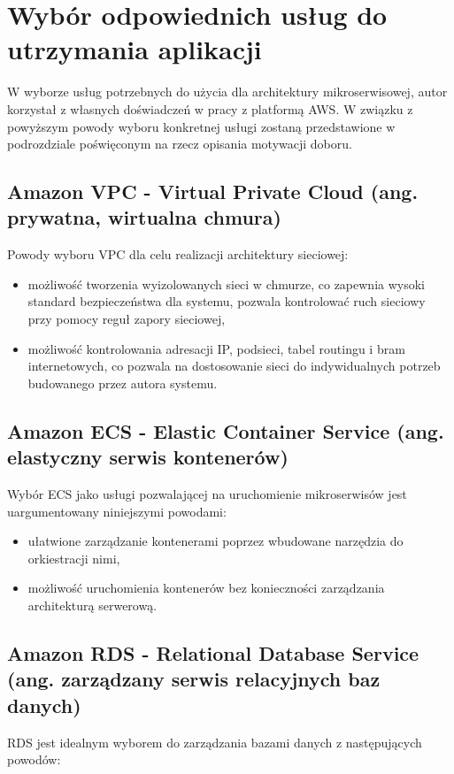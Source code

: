 \documentclass[12pt,twoside]{book}
\begin{document}
    \section{Wybór odpowiednich usług do utrzymania aplikacji}
    W wyborze usług potrzebnych do użycia dla architektury mikroserwisowej, autor korzystał z własnych doświadczeń w pracy z platformą AWS. W związku z powyższym powody wyboru konkretnej usługi zostaną przedstawione w podrozdziale poświęconym na rzecz opisania motywacji doboru.

    \subsection{Amazon VPC - Virtual Private Cloud (ang. prywatna, wirtualna chmura)}
    Powody wyboru VPC dla celu realizacji architektury sieciowej:

    \begin{itemize}
        \item możliwość tworzenia wyizolowanych sieci w chmurze, co zapewnia wysoki standard bezpieczeństwa dla systemu, pozwala kontrolować ruch sieciowy przy pomocy reguł zapory sieciowej,
        \item możliwość kontrolowania adresacji IP, podsieci, tabel routingu i bram internetowych, co pozwala na dostosowanie sieci do indywidualnych potrzeb budowanego przez autora systemu. \cite{aws.vpc}
    \end{itemize}

    \subsection{Amazon ECS - Elastic Container Service (ang. elastyczny serwis kontenerów)}
    Wybór ECS jako usługi pozwalającej na uruchomienie mikroserwisów jest uargumentowany niniejszymi powodami:

    \begin{itemize}
        \item ułatwione zarządzanie kontenerami poprzez wbudowane narzędzia do orkiestracji nimi,
        \item możliwość uruchomienia kontenerów bez konieczności zarządzania architekturą serwerową. \cite{aws.ecs}
    \end{itemize}

    \subsection{Amazon RDS - Relational Database Service (ang. zarządzany serwis relacyjnych baz danych)}
    RDS jest idealnym wyborem do zarządzania bazami danych z następujących powodów:
\end{document}
